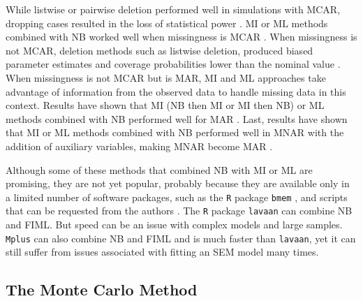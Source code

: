 \documentclass[man]{apa7}\usepackage[]{graphicx}\usepackage[]{xcolor}
\begin{document}
While listwise or pairwise deletion performed well in simulations with MCAR,
dropping cases resulted in the loss of statistical power
\parencite{Lib-Mediation-Missing-Data-Zhang-2012}.
MI or ML methods combined with NB worked well
when missingness is MCAR
\parencite{Lib-Mediation-Missing-Data-Zhang-2012,
	Lib-Mediation-Missing-Data-Wu-2013,
Lib-Mediation-Missing-Data-Zhang-2015}.
When missingness is not MCAR,
deletion methods such as listwise deletion,
produced biased parameter estimates
and coverage probabilities lower than the nominal value
\parencite{Lib-Mediation-Missing-Data-Zhang-2012}.
When missingness is not MCAR but is MAR,
MI and ML approaches take advantage of information
from the observed data to handle missing data in this context.
Results have shown that MI (NB then MI or MI then NB) or ML methods
combined with NB performed well for MAR
\parencite{Lib-Mediation-Missing-Data-Zhang-2012,
	Lib-Mediation-Missing-Data-Wu-2013,
Lib-Mediation-Missing-Data-Zhang-2015}.
Last,
results have shown that MI or ML methods combined with NB
performed well
in MNAR
with the addition of auxiliary variables,
making MNAR become MAR
\parencite{Lib-Mediation-Missing-Data-Zhang-2012,
	Lib-Mediation-Missing-Data-Wu-2013,
Lib-Mediation-Missing-Data-Zhang-2015}.

Although some of these methods that combined NB with MI or ML are promising,
they are not yet popular,
probably because they are available
only in a limited number of software packages,
such as 
the \texttt{R} package \texttt{bmem}
\parencite{Lib-Mediation-Missing-Data-Zhang-2012},
and scripts that can be requested from the authors
\parencite{Lib-Mediation-Missing-Data-Wu-2013}.
The
\texttt{R}
package
\texttt{lavaan}
\parencite{Lib-Structural-Equation-Modeling-Software-Manuals-Rosseel-2012}
can combine NB and FIML.
But speed can be an issue with complex models and large samples.
\texttt{Mplus}
\parencite{Lib-Structural-Equation-Modeling-Software-Manuals-Muthen-2017}
can also combine NB and FIML
and is much faster than
\texttt{lavaan},
yet it can still suffer from
issues associated with fitting an SEM model many times.

\subsection{The Monte Carlo Method}
\end{document}
